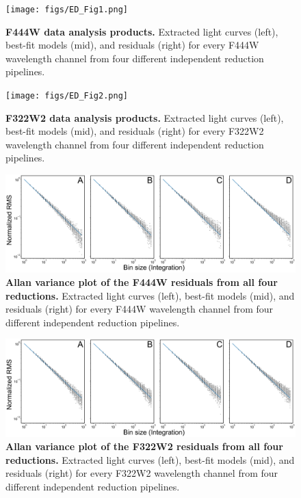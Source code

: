 \documentclass[sn-standardnature]{sn-jnl}%
\begin{document}
\begin{figure}
\centering
  \texttt{[image: figs/ED\_Fig1.png]}
  \caption{\textbf{F444W data analysis products.} Extracted light curves (left), best-fit models (mid), and residuals (right) for every F444W wavelength channel from four different independent reduction pipelines.}
  \label{fig:F444_data_model_residual_each_amp}
\end{figure}

\begin{figure}
\centering
  \texttt{[image: figs/ED\_Fig2.png]}
  \caption{\textbf{F322W2 data analysis products.} Extracted light curves (left), best-fit models (mid), and residuals (right) for every F322W2 wavelength channel from four different independent reduction pipelines.}
  \label{fig:F322_data_model_residual_each_amp}
\end{figure}

\begin{figure}
\centering
  \includegraphics[width=\textwidth,keepaspectratio]{figs/ED_Fig3.png}
  \caption{\textbf{Allan variance plot of the F444W residuals from all four reductions.} Extracted light curves (left), best-fit models (mid), and residuals (right) for every F444W wavelength channel from four different independent reduction pipelines.}
  \label{fig:allen_plot_F444_each_amp}
\end{figure}

\begin{figure}
\centering
  \includegraphics[width=\textwidth,keepaspectratio]{figs/ED_Fig4.png}
  \caption{\textbf{Allan variance plot of the F322W2 residuals from all four reductions.} Extracted light curves (left), best-fit models (mid), and residuals (right) for every F322W2 wavelength channel from four different independent reduction pipelines.}
  \label{fig:allen_plot_F322_each_amp}
\end{figure}
\end{document}
